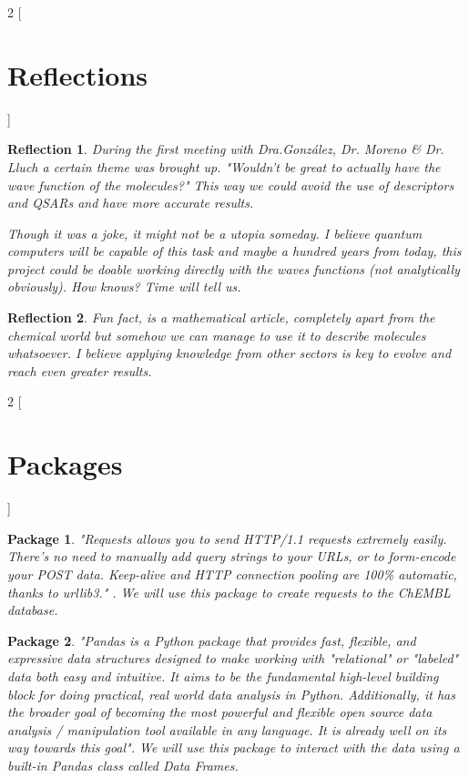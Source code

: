 \documentclass[12pt,letterpaper]{article}
\newtheorem{reflection}{Reflection}
\newtheorem{PyPackage}{Package}
\begin{document}
\begin{multicols}{2}
[
\section{Reflections}
]
\begin{reflection}
During the first meeting with Dra.González, Dr. Moreno \& Dr. Lluch a certain theme was brought up. "Wouldn't be great to actually have the wave function of the molecules?" This way we could avoid the use of descriptors and QSARs and have more accurate results. \par
Though it was a joke, it might not be a utopia someday. I believe quantum computers will be capable of this task and maybe a hundred years from today, this project could be doable working directly with the waves functions (not analytically obviously). How knows? Time will tell us.
\end{reflection}
\begin{reflection}
Fun fact, \cite{ZagrebIndicesArticle} is a mathematical article, completely apart from the chemical world but somehow we can manage to use it to describe molecules whatsoever. I believe applying knowledge from other sectors is key to evolve and reach even greater results.
\end{reflection}
\end{multicols}

\begin{multicols}{2}
[
\section{Packages}
]
\begin{PyPackage}
"Requests allows you to send HTTP/1.1 requests extremely easily. There’s no need to manually add query strings to your URLs, or to form-encode your POST data. Keep-alive and HTTP connection pooling are 100\% automatic, thanks to urllib3."
\cite{PythonPackageRequests}. We will use this package to create requests to the ChEMBL database.
\end{PyPackage}

\begin{PyPackage}
"Pandas is a Python package that provides fast, flexible, and expressive data structures designed to make working with "relational" or "labeled" data both easy and intuitive. It aims to be the fundamental high-level building block for doing practical, real world data analysis in Python. Additionally, it has the broader goal of becoming the most powerful and flexible open source data analysis / manipulation tool available in any language. It is already well on its way towards this goal"\cite{PythonPackagePandas}. We will use this package to interact with the data using a built-in Pandas class called \emph{Data Frames}.
\end{PyPackage}
\end{multicols}
\end{document}
